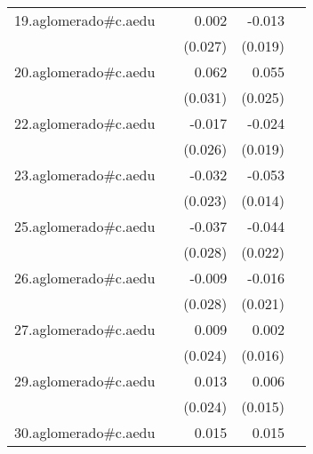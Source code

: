 {\begin{longtable}{l*{4}{D{.}{.}{-1}}}
\addlinespace
19.aglomerado#c.aedu&                     &       0.002         &      -0.013         &                     \\
            &                     &     (0.027)         &     (0.019)         &                     \\
\addlinespace
20.aglomerado#c.aedu&                     &       0.062\sym{*}  &       0.055\sym{*}  &                     \\
            &                     &     (0.031)         &     (0.025)         &                     \\
\addlinespace
22.aglomerado#c.aedu&                     &      -0.017         &      -0.024         &                     \\
            &                     &     (0.026)         &     (0.019)         &                     \\
\addlinespace
23.aglomerado#c.aedu&                     &      -0.032         &      -0.053\sym{***}&                     \\
            &                     &     (0.023)         &     (0.014)         &                     \\
\addlinespace
25.aglomerado#c.aedu&                     &      -0.037         &      -0.044\sym{*}  &                     \\
            &                     &     (0.028)         &     (0.022)         &                     \\
\addlinespace
26.aglomerado#c.aedu&                     &      -0.009         &      -0.016         &                     \\
            &                     &     (0.028)         &     (0.021)         &                     \\
\addlinespace
27.aglomerado#c.aedu&                     &       0.009         &       0.002         &                     \\
            &                     &     (0.024)         &     (0.016)         &                     \\
\addlinespace
29.aglomerado#c.aedu&                     &       0.013         &       0.006         &                     \\
            &                     &     (0.024)         &     (0.015)         &                     \\
\addlinespace
30.aglomerado#c.aedu&                     &       0.015         &       0.015         &                     \\

\end{longtable}}
